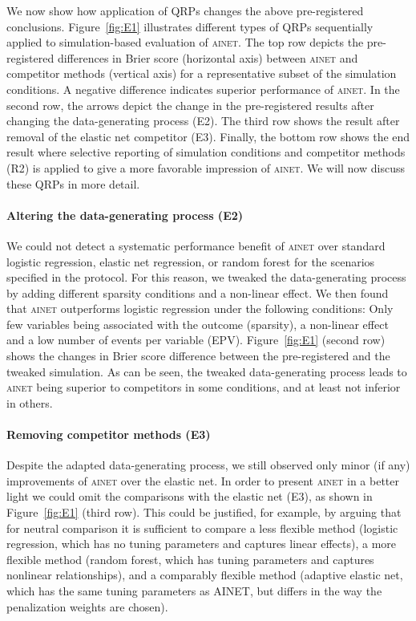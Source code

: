 \documentclass[a4paper, 11pt]{article}
\newcommand{\ainet}{\textsc{ainet}}
\begin{document}
We now show how application of QRPs changes the above pre-registered
conclusions. Figure~\ref{fig:E1} illustrates different types of QRPs
sequentially applied to simulation-based evaluation of \ainet{}. The top row
depicts the pre-registered differences in Brier score (horizontal axis) between
\ainet{} and competitor methods (vertical axis) for a representative subset of
the simulation conditions. A negative difference indicates superior performance
of \ainet{}. In the second row, the arrows depict the change in the
pre-registered results after changing the data-generating process (E2). The
third row shows the result after removal of the elastic net competitor (E3).
Finally, the bottom row shows the end result where selective reporting of
simulation conditions and competitor methods (R2) is applied to give a more
favorable impression of \ainet{}. We will now discuss these QRPs in more detail.

\paragraph{Altering the data-generating process (E2)}
We could not detect a systematic performance benefit of \ainet{} over standard
logistic regression, elastic net regression, or random forest for the scenarios
specified in the protocol. For this reason, we tweaked the data-generating
process by adding different sparsity conditions and a non-linear effect. We then
found that \ainet{} outperforms logistic regression under the following
conditions: Only few variables being associated with the outcome (sparsity), a
non-linear effect and a low number of events per variable (EPV).
Figure~\ref{fig:E1} (second row) shows the changes in Brier score difference
between the pre-registered and the tweaked simulation. As can be seen, the
tweaked data-generating process leads to \ainet{} being superior to competitors
in some conditions, and at least not inferior in others.

\paragraph{Removing competitor methods (E3)}
Despite the adapted data-generating process, we still observed only minor (if
any) improvements of \ainet{} over the elastic net. In order to present \ainet{}
in a better light we could omit the comparisons with the elastic net (E3), as
shown in Figure~\ref{fig:E1} (third row). This could be justified, for example,
by arguing that for neutral comparison it is sufficient to compare a less
flexible method (logistic regression, which has no tuning parameters and
captures linear effects), a more flexible method (random forest, which has
tuning parameters and captures nonlinear relationships), and a comparably
flexible method (adaptive elastic net, which has the same tuning parameters as
AINET, but differs in the way the penalization weights are chosen).
\end{document}
